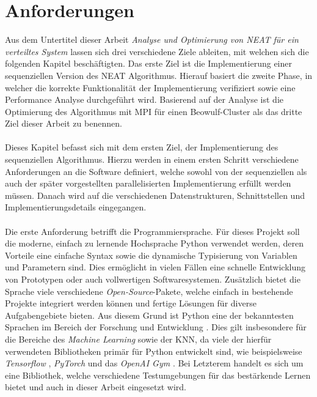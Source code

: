 \section{Anforderungen}
\label{sec:requirements}
Aus dem Untertitel dieser Arbeit \emph{Analyse und Optimierung von \ac{NEAT} für ein verteiltes System} lassen sich drei verschiedene Ziele ableiten, mit welchen sich die folgenden Kapitel beschäftigten. Das erste Ziel ist die Implementierung einer sequenziellen Version des \ac{NEAT} Algorithmus. Hierauf basiert die zweite Phase, in welcher die korrekte Funktionalität der Implementierung verifiziert sowie eine Performance Analyse durchgeführt wird. Basierend auf der Analyse ist die Optimierung des Algorithmus mit \ac{MPI} für einen Beowulf-Cluster als das dritte Ziel dieser Arbeit zu benennen.
\\\\
Dieses Kapitel befasst sich mit dem ersten Ziel, der Implementierung des sequenziellen Algorithmus. Hierzu werden in einem ersten Schritt verschiedene Anforderungen an die Software definiert, welche sowohl von der sequenziellen als auch der später vorgestellten parallelisierten Implementierung erfüllt werden müssen. Danach wird auf die verschiedenen Datenstrukturen, Schnittstellen und Implementierungsdetails eingegangen.
\\\\
Die erste Anforderung betrifft die Programmiersprache. Für dieses Projekt soll die moderne, einfach zu lernende Hochsprache Python verwendet werden, deren Vorteile eine einfache Syntax sowie die dynamische Typisierung von Variablen und Parametern sind. Dies ermöglicht in vielen Fällen eine schnelle Entwicklung von Prototypen oder auch vollwertigen Softwaresystemen. Zusätzlich bietet die Sprache viele verschiedene \emph{Open-Source}-Pakete, welche einfach in bestehende Projekte integriert werden können und fertige Lösungen für diverse Aufgabengebiete bieten. Aus diesem Grund ist Python eine der bekanntesten Sprachen im Bereich der Forschung und Entwicklung \cite{dalcin2011parallel}. Dies gilt insbesondere für die Bereiche des \emph{Machine Learning} sowie der \ac{KNN}, da viele der hierfür verwendeten Bibliotheken primär für Python entwickelt sind, wie beispielsweise \emph{Tensorflow} \cite{tensorflow2015}, \emph{PyTorch} \cite{pytorch2019} und das \emph{OpenAI Gym} \cite{OpenAiGym2016}. Bei Letzterem handelt es sich um eine Bibliothek, welche verschiedene Testumgebungen für das bestärkende Lernen bietet und auch in dieser Arbeit eingesetzt wird.  
\\\\
